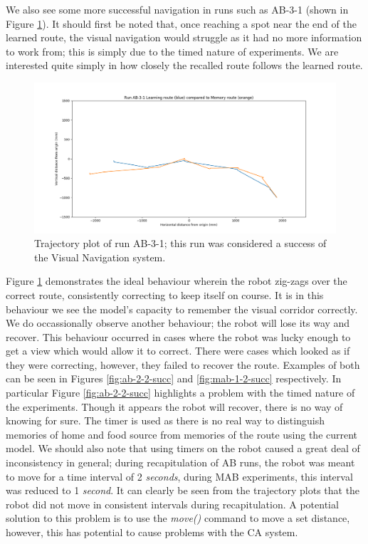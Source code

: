 \documentclass[a4paper,12pt]{article}
\begin{document}
We also see some more successful navigation in runs such as AB-3-1 (shown in Figure \ref{fig:ab-3-1-succ}). It should first be
noted that, once reaching a spot near the end of the learned route, the visual navigation would struggle as it had no
more information to work from; this is simply due to the timed nature of experiments. We are interested quite simply in how
closely the recalled route follows the learned route. 

\begin{figure}
 \centering
  \includegraphics[width=\textwidth]{AB-3-1}
  \caption{
    \label{fig:ab-3-1-succ} Trajectory plot of run AB-3-1; this run was considered a success of the Visual Navigation
    system.
  }
\end{figure}

Figure \ref{fig:ab-3-1-succ} demonstrates the ideal behaviour wherein the robot zig-zags over the correct route, consistently
correcting to keep itself on course. It is in this behaviour we see the model's capacity to remember the visual corridor
correctly. We do occassionally observe another behaviour; the robot will lose its way and recover. This behaviour occurred in
cases where the robot was lucky enough to get a view which would allow it to correct. There were cases which looked as if
they were correcting, however, they failed to recover the route. Examples of both can be seen in Figures \ref{fig:ab-2-2-succ}
and \ref{fig:mab-1-2-succ} respectively. In particular Figure \ref{fig:ab-2-2-succ} highlights a problem with the timed
nature of the experiments. Though it appears the robot will recover, there is no way of knowing for sure.
The timer is used as there is no real way to distinguish memories of home and food source from memories of the route using
the current model. We should also note that using timers on the robot caused a great deal of inconsistency in general; during
recapitulation of AB runs, the robot was meant to move for a time interval of 2 \textit{seconds}, during MAB experiments, this
interval was reduced to 1 \textit{second}. It can clearly be seen from the trajectory plots that the robot did not move in
consistent intervals during recapitulation. A potential solution to this problem is to use the \textit{move()} command to
move a set distance, however, this has potential to cause problems with the CA system.
\end{document}
